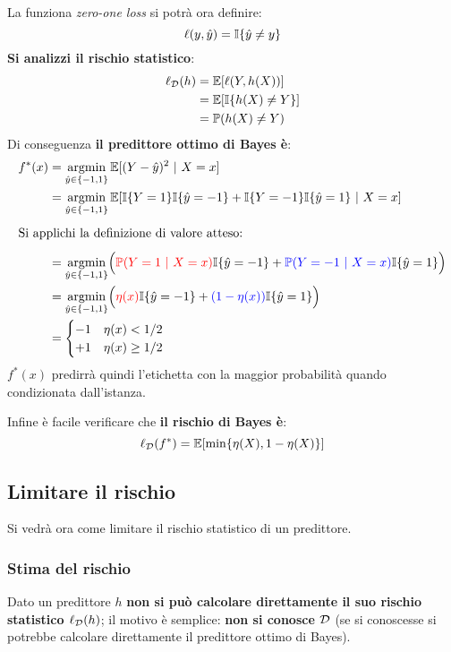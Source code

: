 La funziona \textit{zero-one loss} si potrà ora definire:
$$ \ell(y,\hat{y}) = \mathbb{I}\{\hat{y}\neq y\} $$
\textbf{Si analizzi il rischio statistico}:
$$
\begin{aligned}
    \ell_{\mathcal{D}}(h) &= \mathbb{E}[\ell(Y,h(X))]\\
               &= \mathbb{E}[\mathbb{I}\{h(X)\neq Y\}]\\
               &= \mathbb{P}(h(X)\neq Y)\\
\end{aligned}
$$
Di conseguenza \textbf{il predittore ottimo di Bayes è}:
\begin{align}
    f^*(x) &= \argmin_{\hat{y}\in\{-1,1\}} \E[(Y-\hat{y})^2 \ | \ X=x]  \notag\\
    &= \argmin_{\hat{y}\in\{-1,1\}} \E[
        \I\{Y=1\}\I\{\hat{y}=-1\}+\I\{Y=-1\}\I\{\hat{y}=1 \} \ | \ X=x
        ]  \notag\\[.6em]
        \multispan2{Si applichi la definizione di valore atteso:\hfill}\notag\\[.6em]
    &= \argmin_{\hat{y}\in\{-1,1\}} \Bigl(
        {\color{red}\Prob(Y=1 \ | \ X=x)}\I\{\hat{y}=-1\}+{\color{blue}\Prob(Y=-1 \ | \ X=x)}\I\{\hat{y}=1\}
    \Bigl)\notag\\
    &= \argmin_{\hat{y}\in\{-1,1\}} \Bigl(
        {\color{red}\eta(x)}\I\{\hat{y}=-1\}+{\color{blue}(1-\eta(x))}\I\{\hat{y}=1\}
    \Bigl)\notag\\
    &= \begin{cases}
        -1 & \eta(x)<1/2\\ 
        +1 & \eta(x)\geq1/2\\
    \end{cases}\notag
\end{align}
$f^*(x)$ predirrà quindi l'etichetta con la maggior probabilità quando condizionata
dall'istanza.

Infine è facile verificare che \textbf{il rischio di Bayes è}:
$$ \ell_{\mathcal{D}}(f^*)=\mathbb{E}[\min\{\eta(X),1-\eta(X)\}] $$

\subsection{Limitare il rischio}
Si vedrà ora come limitare il rischio statistico di un predittore.

\subsubsection{Stima del rischio}
Dato un predittore $h$ \textbf{non si può calcolare direttamente il suo rischio 
statistico $\ell_{\mathcal{D}}(h)$}; il motivo è semplice: \textbf{non si conosce $\mathcal{D}$} (se 
si conoscesse si potrebbe calcolare direttamente il predittore ottimo di Bayes).

